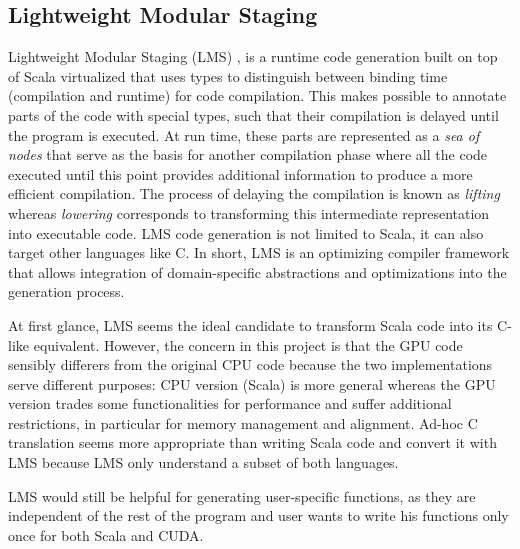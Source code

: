 \subsection{Lightweight Modular Staging} \label{intro_lms}
Lightweight Modular Staging (LMS) \cite{lms}, \cite{lms_thesis} is a runtime code generation built on top of Scala virtualized \cite{scala_virtualized} that uses types to distinguish between binding time (compilation and runtime) for code compilation. This makes possible to annotate parts of the code with special types, such that their compilation is delayed until the program is executed. At run time, these parts are represented as a \textit{sea of nodes} that serve as the basis for another compilation phase where all the code executed until this point provides additional information to produce a more efficient compilation. The process of delaying the compilation is known as \textit{lifting} whereas \textit{lowering} corresponds to transforming this intermediate representation into executable code. LMS code generation is not limited to Scala, it can also target other languages like C. In short, LMS is an optimizing compiler framework that allows integration of domain-specific abstractions and optimizations into the generation process.

At first glance, LMS seems the ideal candidate to transform Scala code into its C-like equivalent. However, the concern in this project is that the GPU code sensibly differers from the original CPU code because the two implementations serve different purposes: CPU version (Scala) is more general whereas the GPU version trades some functionalities for performance and suffer additional restrictions, in particular for memory management and alignment. Ad-hoc C translation seems more appropriate than writing Scala code and convert it with LMS because LMS only understand a subset of both languages.

LMS would still be helpful for generating user-specific functions, as they are independent of the rest of the program and user wants to write his functions only once for both Scala and CUDA.
